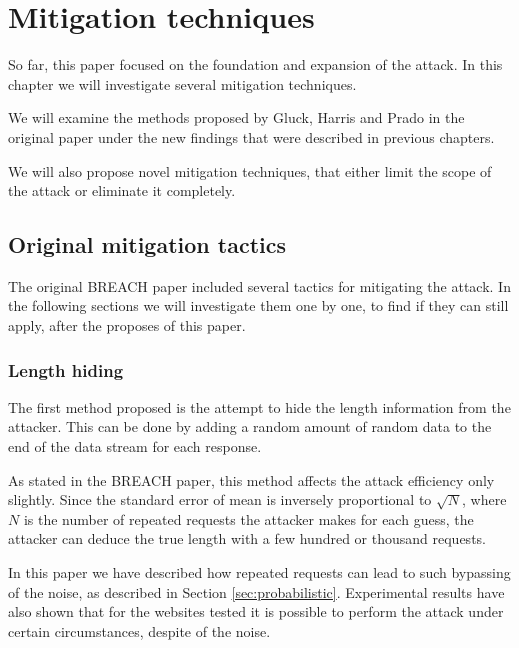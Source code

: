 \chapter{Mitigation techniques}\label{ch:mitigation}

So far, this paper focused on the foundation and expansion of the attack. In
this chapter we will investigate several mitigation techniques.

We will examine the methods proposed by Gluck, Harris and Prado in the original
paper under the new findings that were described in previous chapters.

We will also propose novel mitigation techniques, that either limit the scope of
the attack or eliminate it completely.

\section{Original mitigation tactics}\label{sec:original_mitigation}

The original BREACH paper \cite{breach} included several tactics for mitigating
the attack. In the following sections we will investigate them one by one, to
find if they can still apply, after the proposes of this paper.

\subsection{Length hiding}

The first method proposed is the attempt to hide the length information from the
attacker. This can be done by adding a random amount of random data to the end
of the data stream for each response.

As stated in the BREACH paper, this method affects the attack efficiency only
slightly. Since the standard error of mean is inversely proportional to
\begin{math}\sqrt{N}\end{math}, where \begin{math}N\end{math} is the number of
repeated requests the attacker makes for each guess, the attacker can deduce the
true length with a few hundred or thousand requests.

In this paper we have described how repeated requests can lead to such bypassing
of the noise, as described in Section \ref{sec:probabilistic}.  Experimental
results have also shown that for the websites tested it is possible to perform
the attack under certain circumstances, despite of the noise.

